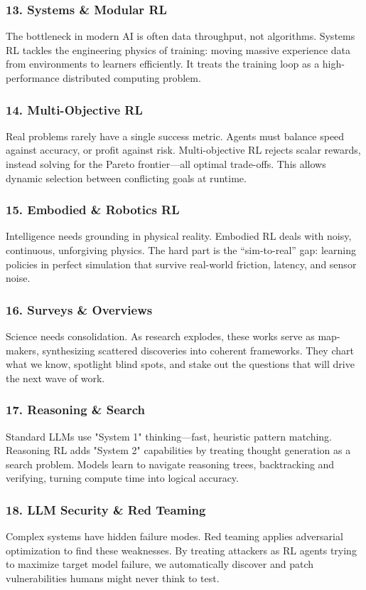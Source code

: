\documentclass[12pt,a4paper]{report}
\theoremstyle{definition}
\begin{document}
\subsubsection*{13. Systems \& Modular RL}
The bottleneck in modern AI is often data throughput, not algorithms. Systems RL tackles the engineering physics of training: moving massive experience data from environments to learners efficiently. It treats the training loop as a high-performance distributed computing problem.

\subsubsection*{14. Multi-Objective RL}
Real problems rarely have a single success metric. Agents must balance speed against accuracy, or profit against risk. Multi-objective RL rejects scalar rewards, instead solving for the Pareto frontier---all optimal trade-offs. This allows dynamic selection between conflicting goals at runtime.

\subsubsection*{15. Embodied \& Robotics RL}
Intelligence needs grounding in physical reality. Embodied RL deals with noisy, continuous, unforgiving physics. The hard part is the ``sim-to-real'' gap: learning policies in perfect simulation that survive real-world friction, latency, and sensor noise.

\subsubsection*{16. Surveys \& Overviews}
Science needs consolidation. As research explodes, these works serve as map-makers, synthesizing scattered discoveries into coherent frameworks. They chart what we know, spotlight blind spots, and stake out the questions that will drive the next wave of work.

\subsubsection*{17. Reasoning \& Search}
Standard LLMs use "System 1" thinking---fast, heuristic pattern matching. Reasoning RL adds "System 2" capabilities by treating thought generation as a search problem. Models learn to navigate reasoning trees, backtracking and verifying, turning compute time into logical accuracy.

\subsubsection*{18. LLM Security \& Red Teaming}
Complex systems have hidden failure modes. Red teaming applies adversarial optimization to find these weaknesses. By treating attackers as RL agents trying to maximize target model failure, we automatically discover and patch vulnerabilities humans might never think to test.
\end{document}
